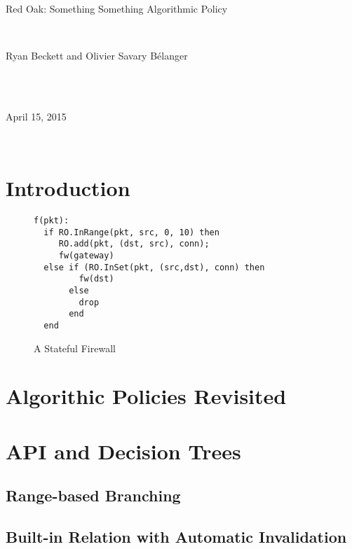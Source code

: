 \documentclass[12pt]{article}
\begin{document}
\quad \\
\quad \\
\quad \\
\centerline{ \large{Red Oak: Something Something Algorithmic Policy}}
\vspace{1pt}\\
\centerline{Ryan Beckett and Olivier Savary B\'{e}langer} \\
\\
\centerline{April 15, 2015} \\


\section*{Introduction}

\begin{figure}
\begin{lstlisting}
f(pkt):
  if RO.InRange(pkt, src, 0, 10) then
     RO.add(pkt, (dst, src), conn);
     fw(gateway)
  else if (RO.InSet(pkt, (src,dst), conn) then
         fw(dst)   
       else
         drop
       end
  end                
  \end{lstlisting}

\caption{A Stateful Firewall}
\end{figure}

\section*{Algorithic Policies Revisited}

\section*{API and Decision Trees}
   \subsection*{Range-based Branching}

   
   
   \subsection*{Built-in Relation with Automatic Invalidation}
\end{document}

